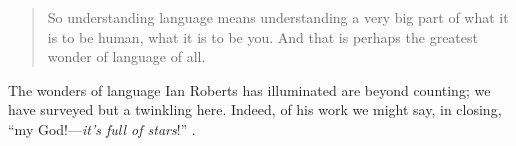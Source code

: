 \documentclass[output=paper]{langsci/langscibook}
\begin{document}
\begin{quote}

    So understanding language means understanding a very big part of what it is
    to be human, what it is to be you. And that is perhaps the greatest wonder
    of language of all. \citep[182]{Roberts2017}

\end{quote}

The wonders of language Ian Roberts has illuminated are beyond counting; we
have surveyed but a twinkling here. Indeed, of his work we might say, in
closing, “my God!—\emph{it’s full of stars}!” \citep[202]{Clarke1968}.

\printchapterglossary{}

{\sloppy
\printbibliography[heading=subbibliography,notkeyword=this]
}
\end{document}
